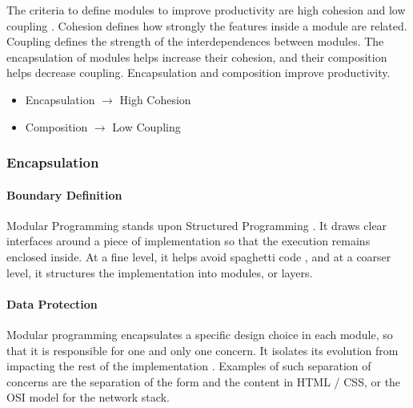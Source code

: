 The criteria to define modules to improve productivity are high cohesion and low coupling \cite{Stevens1974}.
Cohesion defines how strongly the features inside a module are related.
Coupling defines the strength of the interdependences between modules.
The encapsulation of modules helps increase their cohesion, and their composition helps decrease coupling.
Encapsulation and composition improve productivity.

\begin{itemize}
\item Encapsulation $\to$ High Cohesion
\item Composition $\to$ Low Coupling
\end{itemize}

\subsubsection{Encapsulation} \label{chapter3:definitions:productivity:encapsulation}

\paragraph{Boundary Definition}
%
Modular Programming stands upon Structured Programming \cite{Dijkstra1970}.
It draws clear interfaces around a piece of implementation so that the execution remains enclosed inside.
At a fine level, it helps avoid spaghetti code \cite{Dijkstra1968a}, and at a coarser level, it structures the implementation \cite{Dijkstra1968} into modules, or layers.

\paragraph{Data Protection}
%
Modular programming encapsulates a specific design choice in each module, so that it is responsible for one and only one concern.
It isolates its evolution from impacting the rest of the implementation \cite{Parnas1972, Tarr1999, Hursch1995}.
Examples of such separation of concerns are the separation of the form and the content in HTML / CSS, or the OSI model for the network stack.

